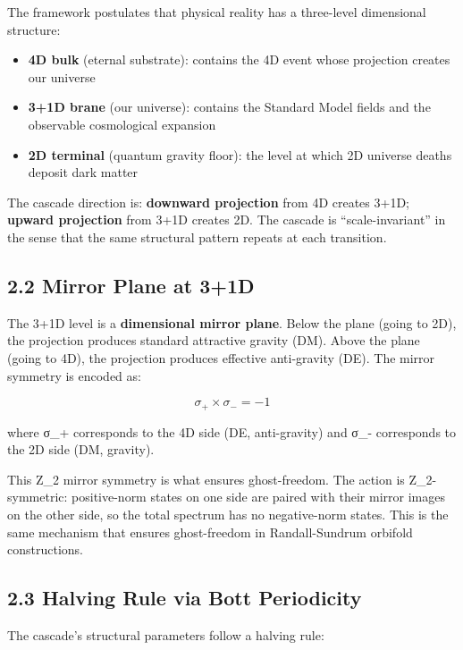 The framework postulates that physical reality has a three-level
dimensional structure:

\begin{itemize}
\tightlist
\item
  \textbf{4D bulk} (eternal substrate): contains the 4D event whose
  projection creates our universe
\item
  \textbf{3+1D brane} (our universe): contains the Standard Model fields
  and the observable cosmological expansion
\item
  \textbf{2D terminal} (quantum gravity floor): the level at which 2D
  universe deaths deposit dark matter
\end{itemize}

The cascade direction is: \textbf{downward projection} from 4D creates
3+1D; \textbf{upward projection} from 3+1D creates 2D. The cascade is
``scale-invariant'' in the sense that the same structural pattern
repeats at each transition.

\hypertarget{mirror-plane-at-31d}{%
\subsection{2.2 Mirror Plane at 3+1D}\label{mirror-plane-at-31d}}

The 3+1D level is a \textbf{dimensional mirror plane}. Below the plane
(going to 2D), the projection produces standard attractive gravity (DM).
Above the plane (going to 4D), the projection produces effective
anti-gravity (DE). The mirror symmetry is encoded as:

\[\sigma_+ \times \sigma_- = -1\]

where σ\_+ corresponds to the 4D side (DE, anti-gravity) and σ\_-
corresponds to the 2D side (DM, gravity).

This Z\_2 mirror symmetry is what ensures ghost-freedom. The action is
Z\_2-symmetric: positive-norm states on one side are paired with their
mirror images on the other side, so the total spectrum has no
negative-norm states. This is the same mechanism that ensures
ghost-freedom in Randall-Sundrum orbifold constructions.

\hypertarget{halving-rule-via-bott-periodicity}{%
\subsection{2.3 Halving Rule via Bott
Periodicity}\label{halving-rule-via-bott-periodicity}}

The cascade's structural parameters follow a halving rule:

